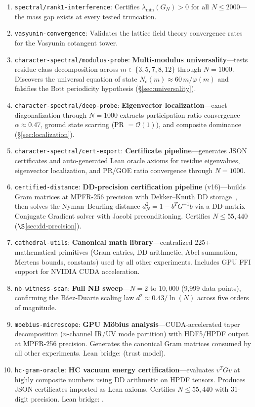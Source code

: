 \documentclass[11pt,a4paper]{article}
\begin{document}
\begin{enumerate}
    effective exponent $A_{\mathrm{BC}}$ ($\approx 0.03$--$0.08$ with
    $300\times$ safety margin).
  \item \texttt{spectral/rank1-interference}: Certifies
    $\lambda_{\min}(G_N) > 0$ for all $N \leq 2000$---the mass gap
    exists at every tested truncation.
  \item \texttt{vasyunin-convergence}: Validates the lattice field theory
    convergence rates for the Vasyunin cotangent tower.
  \item \texttt{character-spectral/modulus-probe}: \textbf{Multi-modulus
    universality}---tests residue class decomposition across
    $m \in \{3,5,7,8,12\}$ through $N = 1000$. Discovers the universal
    equation of state $N_c(m) \approx 60\,m/\varphi(m)$ and falsifies
    the Bott periodicity hypothesis (\S\ref{sec:universality}).
  \item \texttt{character-spectral/deep-probe}: \textbf{Eigenvector
    localization}---exact diagonalization through $N = 1000$ extracts
    participation ratio convergence $\alpha \approx 0.47$, ground state
    scarring (PR $= \mathcal{O}(1)$), and composite dominance
    (\S\ref{sec:localization}).
  \item \texttt{character-spectral/cert-export}: \textbf{Certificate
    pipeline}---generates JSON certificates and auto-generated Lean
    oracle axioms for residue eigenvalues, eigenvector localization,
    and PR/GOE ratio convergence through $N = 1000$.
  \item \texttt{certified-distance}: \textbf{DD-precision certification
    pipeline} (v16)---builds Gram matrices at MPFR-256 precision with
    Dekker--Knuth DD storage~\cite{dekker1971}, then solves the
    Nyman--Beurling distance $d_N^2 = 1 - b^T G^{-1} b$ via a DD-matrix
    Conjugate Gradient solver with Jacobi preconditioning. Certifies
    $N \leq 55{,}440$ ($\S$\ref{sec:dd-precision}).
  \item \texttt{cathedral-utils}: \textbf{Canonical math library}---centralized
    225+ mathematical primitives (Gram entries, DD arithmetic, Abel summation,
    Mertens bounds, constants) used by all other experiments. Includes
    GPU FFI support for NVIDIA CUDA acceleration.
  \item \texttt{nb-witness-scan}: \textbf{Full NB sweep}---$N = 2$ to $10{,}000$
    (9,999 data points), confirming the B\'aez-Duarte scaling law
    $d^2 \approx 0.43/\ln(N)$ across five orders of magnitude.
  \item \texttt{moebius-microscope}: \textbf{GPU M\"obius analysis}---CUDA-accelerated
    taper decomposition ($n$-channel IR/UV mode partition) with HDF5/HPDF
    output at MPFR-256 precision. Generates the canonical Gram matrices
    consumed by all other experiments. Lean bridge:
     (trust model).
  \item \texttt{hc-gram-oracle}: \textbf{HC vacuum energy certification}---evaluates
    $v^T G v$ at highly composite numbers using DD arithmetic on HPDF
    tensors. Produces JSON certificates imported as Lean axioms.
    Certifies $N \leq 55{,}440$ with 31-digit precision.
    Lean bridge: .
\end{enumerate}
\end{document}
